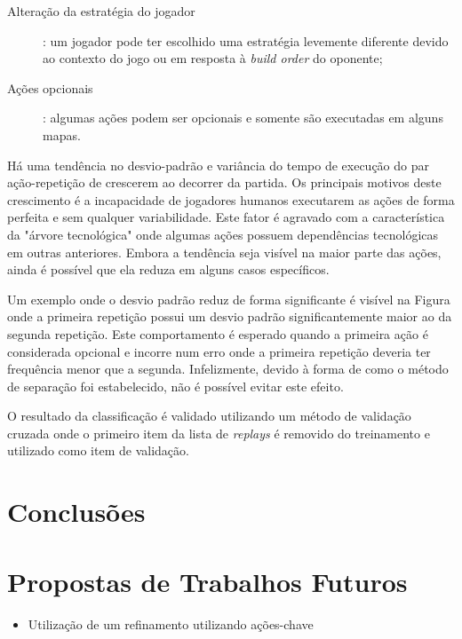 \begin{description}
	\item[Alteração da estratégia do jogador]: um jogador pode ter escolhido uma estratégia levemente diferente devido ao contexto do jogo ou em resposta à \textit{build order} do oponente;
	\item[Ações opcionais]: algumas ações podem ser opcionais e somente são executadas em alguns mapas. 
\end{description}

Há uma tendência no desvio-padrão e variância do tempo de execução do par ação-repetição de crescerem ao decorrer da partida. Os principais motivos deste crescimento é a incapacidade de jogadores humanos executarem as ações de forma perfeita e sem qualquer variabilidade. Este fator é agravado com a característica da "árvore tecnológica" onde algumas ações possuem dependências tecnológicas em outras anteriores. Embora a tendência seja visível na maior parte das ações, ainda é possível que ela reduza em alguns casos específicos.

Um exemplo onde o desvio padrão reduz de forma significante é visível na Figura \todo{} onde a primeira repetição possui um desvio padrão significantemente maior ao da segunda repetição. Este comportamento é esperado quando a primeira ação é considerada opcional e incorre num erro onde a primeira repetição deveria ter frequência menor que a segunda. Infelizmente, devido à forma de como o método de separação foi estabelecido, não é possível evitar este efeito.


O resultado da classificação é validado utilizando um método de validação cruzada onde o primeiro item da lista de \textit{replays} é removido do treinamento e utilizado como item de validação.

	\chapter{Conclusões}


	\chapter{Propostas de Trabalhos Futuros}
\begin{itemize}
	\item Utilização de um refinamento utilizando ações-chave
\end{itemize}

